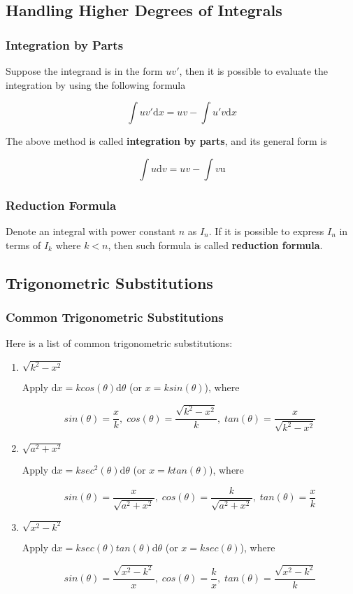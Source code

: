 \documentclass[a4paper,12pt]{article}
\newcommand{\s}{\vspace{1mm}}
\newcommand{\diff}{\mathrm{d}}
\newenvironment{alist}{ %
\begin{enumerate}[label=(\alph*)]
}{
\end{enumerate}
}
\begin{document}
\subsection{Handling Higher Degrees of Integrals}
\subsubsection{Integration by Parts}
Suppose the integrand is in the form $uv'$, then it is possible to evaluate the integration by using the following formula

$$\int uv'\diff x=uv-\int u'v\diff x$$

The above method is called \textbf{integration by parts}, and its general form is

$$\int u\diff v=uv-\int v\mathrm{u}$$

\subsubsection{Reduction Formula}
Denote an integral with power constant $n$ as $I_{n}$. If it is possible to express $I_{n}$ in terms of $I_{k}$ where $k<n$, then such formula is called \textbf{reduction formula}.

\subsection{Trigonometric Substitutions}
\subsubsection{Common Trigonometric Substitutions}
Here is a list of common trigonometric substitutions:

\begin{alist}
  \item $\sqrt{k^{2}-x^{2}}$\s

  Apply $\diff x=kcos(\theta)\diff \theta$ (or $x=ksin(\theta)$), where

  $$sin(\theta)=\frac{x}{k},\; cos(\theta)=\frac{\sqrt{k^{2}-x^{2}}}{k},\; tan(\theta)=\frac{x}{\sqrt{k^{2}-x^{2}}}$$

  \item $\sqrt{a^{2}+x^{2}}$\s

  Apply $\diff x=ksec^{2}(\theta)\diff \theta$ (or $x=ktan(\theta)$), where

  $$sin(\theta)=\frac{x}{\sqrt{a^{2}+x^{2}}},\; cos(\theta)=\frac{k}{\sqrt{a^{2}+x^{2}}},\; tan(\theta)=\frac{x}{k}$$

  \item $\sqrt{x^{2}-k^{2}}$\s

  Apply $\diff x=ksec(\theta)tan(\theta)\diff \theta$ (or $x=ksec(\theta)$), where

  $$sin(\theta)=\frac{\sqrt{x^{2}-k^{2}}}{x},\; cos(\theta)=\frac{k}{x},\; tan(\theta)=\frac{\sqrt{x^{2}-k^{2}}}{k}$$
\end{alist}
\end{document}
